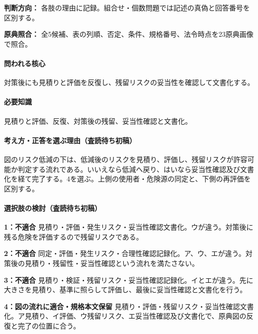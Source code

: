 \noindent\textbf{判断方向：} 各肢の理由に記録。組合せ・個数問題では記述の真偽と回答番号を区別する。\par

\noindent\textbf{原典照合：} 全5候補、表の列順、否定、条件、規格番号、法令時点を23原典画像で照合。\par

\paragraph{問われる核心} 対策後にも見積りと評価を反復し、残留リスクの妥当性を確認して文書化する。

\paragraph{必要知識} 見積りと評価、反復、対策後の残留、妥当性確認と文書化。

\paragraph{考え方・正答を選ぶ理由（査読待ち初稿）} 図のリスク低減の下は、低減後のリスクを見積り、評価し、残留リスクが許容可能か判定する流れである。いいえなら低減へ戻り、はいなら妥当性確認及び文書化を経て完了する。4を選ぶ。上側の使用者・危険源の同定と、下側の再評価を区別する。

\paragraph{選択肢の検討（査読待ち初稿）}\mbox{}\par

\noindent\textbf{1：不適合} 見積り・評価・発生リスク・妥当性確認文書化。ウが違う。対策後に残る危険を評価するので残留リスクである。\par

\noindent\textbf{2：不適合} 同定・評価・発生リスク・合理性確認記録化。ア、ウ、エが違う。対策後の見積り・残留性・妥当性確認という流れを満たさない。\par

\noindent\textbf{3：不適合} 見積り・検証・残留リスク・妥当性確認記録化。イとエが違う。先に大きさを見積り、基準に照らして評価し、最後に妥当性確認と文書化を行う。\par

\noindent\textbf{4：図の流れに適合・規格本文保留} 見積り・評価・残留リスク・妥当性確認文書化。ア見積り、イ評価、ウ残留リスク、エ妥当性確認及び文書化で、原典図の反復と完了の位置に合う。\par

